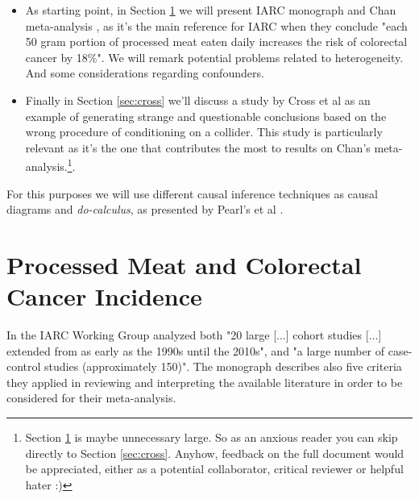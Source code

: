 \documentclass{article}
\begin{document}
\begin{itemize}

\item As starting point, in Section \ref{sec:iarc} we will present IARC monograph and Chan meta-analysis \cite{chan}, as it's the main reference for IARC when they conclude "each 50 gram portion of processed meat eaten daily increases the risk of colorectal cancer by 18\%". We will remark potential problems related to heterogeneity. And some considerations regarding confounders. %
\item Finally in Section \ref{sec:cross} we'll discuss a study by Cross et al \cite{cross} as an example of generating strange and questionable conclusions based on the wrong procedure of conditioning on a collider. This study is particularly relevant as it's the one that contributes the most to results on Chan's meta-analysis.\footnote{%
Section \ref{sec:iarc} is maybe unnecessary large. So as an anxious reader you can skip directly to Section \ref{sec:cross}. Anyhow, feedback on the full document would be appreciated, either as a potential collaborator, critical reviewer or helpful hater :)}.

\end{itemize}

For this purposes we will use different causal inference techniques as causal diagrams and \textit{do-calculus}, as presented by Pearl's et al \cite{bookofwhy}.

\section{Processed Meat and Colorectal Cancer Incidence}
\label{sec:iarc}

In \cite{monograph} the IARC Working Group analyzed both "20 large [...] cohort studies [...] extended from as early as the 1990s until the 2010s", and "a large number of case-control studies (approximately 150)". The monograph describes also five criteria they applied in reviewing and interpreting the available literature in order to be considered for their meta-analysis. %
\end{document}
